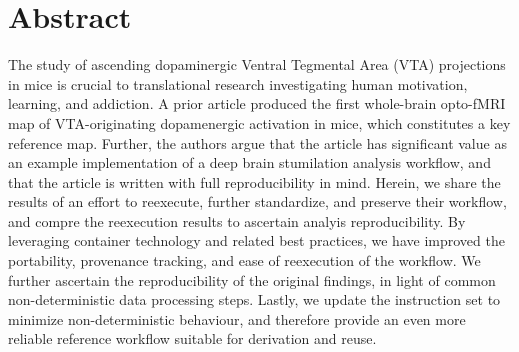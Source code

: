 \section{Abstract}

The study of ascending dopaminergic Ventral Tegmental Area (VTA) projections in mice is crucial to translational research investigating human motivation, learning, and addiction. 
A prior article produced the first whole-brain opto-fMRI map of VTA-originating dopamenergic activation in mice, which constitutes a key reference map.
Further, the authors argue that the article has significant value as an example implementation of a deep brain stumilation analysis workflow, and that the article is written with full reproducibility in mind.
Herein, we share the results of an effort to reexecute, further standardize, and preserve their workflow, and compre the reexecution results to ascertain analyis reproducibility.
By leveraging container technology and related best practices, we have improved the portability, provenance tracking, and ease of reexecution of the workflow. 
We further ascertain the reproducibility of the original findings, in light of common non-deterministic data processing steps.
Lastly, we update the instruction set to minimize non-deterministic behaviour, and therefore provide an even more reliable reference workflow suitable for derivation and reuse. 
